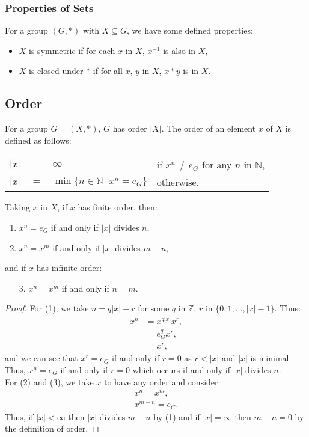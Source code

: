 \subsubsection{Properties of Sets}

For a group $(G, \ast)$ with $X \subseteq G$, we have some defined properties:
\begin{itemize}
    \item $X$ is symmetric if for each $x$ in $X$, $x^{-1}$ is also in $X$,
    \item $X$ is closed under $\ast$ if for all $x$, $y$ in $X$, $x \ast y$ is in $X$.
\end{itemize}

\subsection{Order}

For a group $G = (X, \ast)$, $G$ has order $|X|$. The order of an element $x$ of
$X$ is defined as follows: \begin{center}
    \begin{tabular}{ r c l l }
        $|x|$ & $=$ & $\infty$ & if $x^n \neq e_G$ for any $n$ in $\mathbb{N}$, \\
        $|x|$ & $=$ & $\min\{n \in \mathbb{N} \, | \, x^n = e_G\}$ & otherwise. 
    \end{tabular}
\end{center} Taking $x$ in $X$, if $x$ has finite order, then: \begin{enumerate}
    \item $x^n = e_G$ if and only if $|x|$ divides $n$,
    \item $x^n = x^m$ if and only if $|x|$ divides $m - n$,
\end{enumerate} and if $x$ has infinite order: \begin{enumerate}
    \item[3.] $x^n = x^m$ if and only if $n = m$.
\end{enumerate}

\newpage

\begin{proof}
    For (1), we take $n = q|x| + r$ for some $q$ in $\mathbb{Z}$, 
    $r$ in $\{0, 1, \ldots, |x| - 1\}$. Thus: \begin{align*}
        x^n &= x^{q|x|}x^r, \\
        &= e_G^qx^r, \\
        &= x^r,
    \end{align*} and we can see that $x^r = e_G$ if and only if $r = 0$ as $r < |x|$
    and $|x|$ is minimal. Thus, $x^n = e_G$ if and only if $r = 0$ which occurs
    if and only if $|x|$ divides $n$.
    \\[\baselineskip]
    For (2) and (3), we take $x$ to have any order and consider: \begin{align*}
        x^n = x^m, \\
        x^{m - n} = e_G.
    \end{align*} Thus, if $|x| < \infty$ then $|x|$ divides $m - n$ by (1) and
    if $|x| = \infty$ then $m - n = 0$ by the definition of order.
\end{proof}

